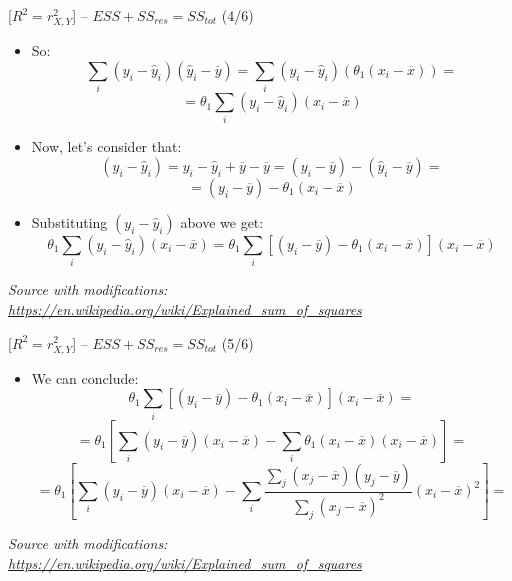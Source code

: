 \documentclass{beamer}
\begin{document}
\begin{frame}
{\centerline{ [$R^2 = r_{X,Y}^2$] -- $ESS + SS_{res} = SS_{tot} $ (4/6)}}

\begin{itemize}
\item So:
$$\sum_i(y_{i}-{\hat {y}}_{i})({\hat {y}}_{i}-{\overline {y}}) = \sum_i(y_{i}-{\hat {y}}_{i})(\theta_1 (x_i - \overline{x}))=$$
$$= \theta_1 \sum_i(y_{i}-{\hat {y}}_{i})(x_i - \overline{x})$$
\item Now, let's consider that:
$$(y_{i}-{\hat {y}}_{i})= y_{i}-{\hat {y}}_{i} + \overline {y} - \overline {y} = (y_{i}-{\overline {y}})-({\hat {y}}_{i}-{\overline {y}})= $$
$$ = (y_{i}-{\overline {y}})-{\theta_1}(x_{i}-{\overline {x}})$$
\item Substituting $(y_{i}-{\hat {y}}_{i})$ above we get:
$$ \theta_1 \sum_i(y_{i}-{\hat {y}}_{i})(x_i - \overline{x})=\theta_1 \sum_i[(y_{i}-{\overline {y}})-{\theta_1}(x_{i}-{\overline {x}}) ](x_i - \overline{x}) $$


\end{itemize}

\textit{\small
Source with modifications: \url{https://en.wikipedia.org/wiki/Explained_sum_of_squares}}
\end{frame}

\begin{frame}
{\centerline{ [$R^2 = r_{X,Y}^2$] -- $ESS + SS_{res} = SS_{tot} $ (5/6)}}

\begin{itemize}
\item We can conclude:
$$ \theta_1 \sum_i[(y_{i}-{\overline {y}})-{\theta_1}(x_{i}-{\overline {x}}) ](x_i - \overline{x}) = $$
$$ = \theta_1 [\sum_i (y_{i}-{\overline {y}}) (x_i - \overline{x}) -
\sum_i{\theta_1}(x_{i}-{\overline {x}}) (x_i - \overline{x})] = $$
$$ = \theta_1 [\sum_i (y_{i}-{\overline {y}}) (x_i - \overline{x}) -
\sum_i{{\frac {\sum _{j}(x_{j}-{\overline {x}})(y_{j}-{\overline {y}})}{\sum _{j}(x_{j}-{\overline {x}})^{2}}}
}(x_{i}-{\overline {x}})^2] = $$


\end{itemize}

\textit{\small
Source with modifications: \url{https://en.wikipedia.org/wiki/Explained_sum_of_squares}}
\end{frame}
\end{document}
